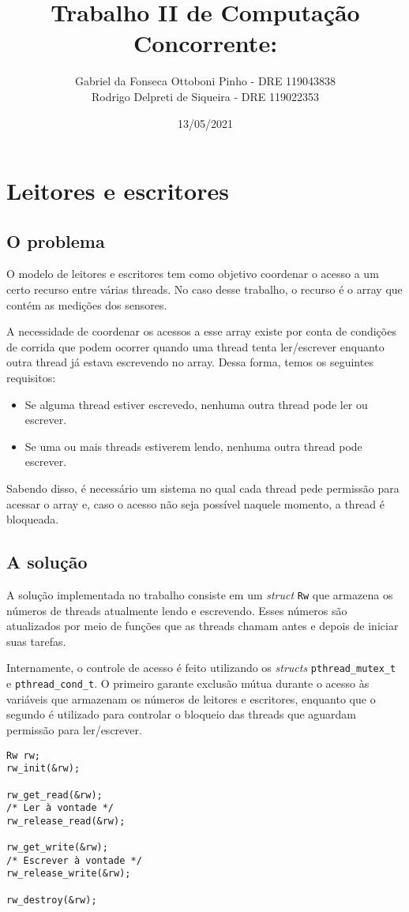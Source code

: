 \documentclass[12pt]{article}
\author{Gabriel da Fonseca Ottoboni Pinho - DRE 119043838\\
Rodrigo Delpreti de Siqueira - DRE 119022353}
\title{Trabalho II de Computação Concorrente:}
\date{13/05/2021}
\begin{document}
\maketitle
\newpage

\section{Leitores e escritores}
\subsection{O problema}
O modelo de leitores e escritores
tem como objetivo coordenar o acesso
a um certo recurso entre várias threads.
No caso desse trabalho,
o recurso é o array
que contém as medições dos sensores.

A necessidade de coordenar
os acessos a esse array existe
por conta de condições de corrida
que podem ocorrer quando
uma thread tenta ler/escrever
enquanto outra thread já estava escrevendo no array.
Dessa forma, temos os seguintes requisitos:
\begin{itemize}
	\item Se alguma thread estiver escrevedo,
		nenhuma outra thread pode ler ou escrever.
	\item Se uma ou mais threads estiverem lendo,
		nenhuma outra thread pode escrever.
\end{itemize}

Sabendo disso,
é necessário um sistema
no qual cada thread pede permissão
para acessar o array e,
caso o acesso não seja possível naquele momento,
a thread é bloqueada.

\subsection{A solução}
A solução implementada no trabalho
consiste em um \textit{struct} \texttt{Rw}
que armazena os números de threads
atualmente lendo e escrevendo.
Esses números são atualizados
por meio de funções que as threads chamam
antes e depois de iniciar suas tarefas.

Internamente,
o controle de acesso é feito utilizando os \textit{structs}
\texttt{pthread\_\-mutex\_t} e \texttt{pthread\_cond\_t}.
O primeiro garante exclusão mútua durante o acesso
às variáveis que armazenam os números de leitores e escritores,
enquanto que o segundo é utilizado para controlar
o bloqueio das threads que aguardam permissão para ler/escrever.

\newpage
\begin{verbatim}
Rw rw;
rw_init(&rw);

rw_get_read(&rw);
/* Ler à vontade */
rw_release_read(&rw);

rw_get_write(&rw);
/* Escrever à vontade */
rw_release_write(&rw);

rw_destroy(&rw);
\end{verbatim}
\end{document}
